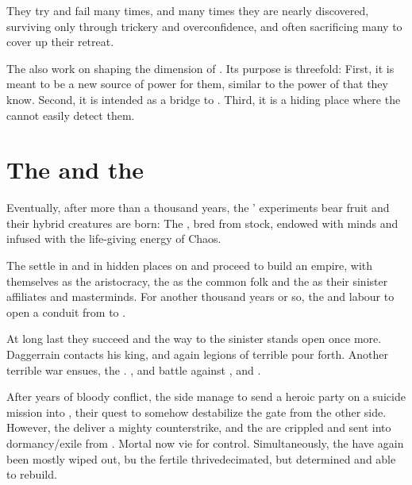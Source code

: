 They try and fail many times, and many times they are nearly discovered, surviving only through trickery and \draconic{} overconfidence, and often sacrificing many \nephilim{} to cover up their retreat. 

The \banes{} also work on shaping the dimension of \Nyx{}. Its purpose is threefold: First, it is meant to be a new source of power for them, similar to the power of \Erebos{} that they know. Second, it is intended as a bridge to \Erebos{}. Third, it is a hiding place where the \dragons{} cannot easily detect them. 







\section{The \Resphain{} and the \Secondbanewar}
Eventually, after more than a thousand years, the \banes{}' experiments bear fruit and their hybrid creatures are born: The \resphain, bred from \nephilic{} stock, endowed with \erebean{} minds and infused with the life-giving energy of Chaos. 

The \resphain{} settle in \Nyx{} and in hidden places on \Miith{} and proceed to build an empire, with themselves as the aristocracy, the \nephilim{} as the common folk and the \banes{} as their sinister affiliates and masterminds. For another thousand years or so, the \banes{} and \resphain{} labour to open a conduit from \Nyx{} to \Erebos{}. 

At long last they succeed and the way to the sinister \baneworld{} stands open once more. Daggerrain contacts his king, and again legions of terrible \banes{} pour forth. Another terrible war ensues, the \secondbanewar. \Dragons{}, \cregorr{} and \scathae{} battle against \banes{}, \resphain{} and \nephilim. 

After years of bloody conflict, the \draconic{} side manage to send a heroic party on a suicide mission into \Erebos{}, their quest to somehow destabilize the gate from the other side. However, the \banes{} deliver a mighty counterstrike, and the \draconic{} \Dominators{} are crippled and sent into dormancy/exile from \Miith{}. Mortal \dragons{} now vie for control. Simultaneously, the \banes{} have again been mostly wiped out, bu the fertile \resphain{} thrive\dash decimated, but determined and able to rebuild. 







